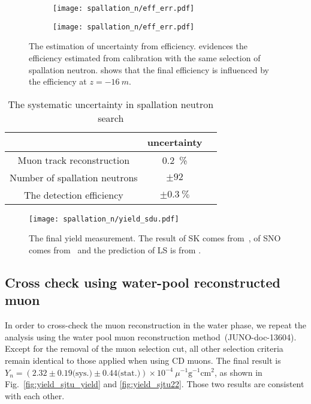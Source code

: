 \begin{figure}[htbp]
	\centering
	\begin{subfigure}{0.5\textwidth}
		\centering
		\texttt{[image: spallation\_n/eff\_err.pdf]}
		\caption{}
		\label{fig:SPNsourceCalib}
	\end{subfigure}%
	\begin{subfigure}{0.5\textwidth}
		\centering
		\texttt{[image: spallation\_n/eff\_err.pdf]}
		\caption{}
		\label{fig:muonEffUncerntainty}
	\end{subfigure}

	\caption{The estimation of uncertainty from efficiency.  evidences the efficiency estimated from  calibration with the same selection of spallation neutron.  shows that the final efficiency is influenced by the efficiency at $z=\SI{-16}{m}$.}
	\label{fig:muonEffUncer}
\end{figure}

\begin{table}[htbp]
	\caption{The systematic uncertainty in spallation neutron search}%
	\label{tab:spn_eff_un}
	\centering%
	\begin{tabular}{ccc}
		\toprule%
		                              & uncertainty       \\
		\midrule%
		Muon track reconstruction     & \SI{0.2}{\%}      \\
		Number of spallation neutrons & $\pm92$           \\
		The detection efficiency      & $\pm\SI{0.3}{\%}$ \\
		\bottomrule
	\end{tabular}
\end{table}

\begin{figure}[htbp]
	\centering
	\texttt{[image: spallation\_n/yield\_sdu.pdf]}
	\caption{The final yield measurement. The result of SK comes from~\cite{SK_spnYn}, of SNO comes from~\cite{sno_spnYn} and the prediction of LS is from \cite{Predict_LS_Wang}.}
	\label{fig:yield_final}
\end{figure}
\subsection{Cross check using water-pool reconstructed muon}
In order to cross-check the muon reconstruction in the water phase, we repeat the analysis using the water pool muon reconstruction method~(JUNO-doc-13604). Except for the removal of the muon selection cut, all other selection criteria remain identical to those applied when using CD muons. The final result is $Y_n =( 2.32\pm0.19\text{(sys.)}\pm0.44 \text{(stat.)}) \times 10^{-4}~\mu^{-1}\text{g}^{-1}\text{cm}^2$, as shown in Fig.~\ref{fig:yield_sjtu_yield} and \ref{fig:yield_sjtu22}. Those two results are consistent with each other.

